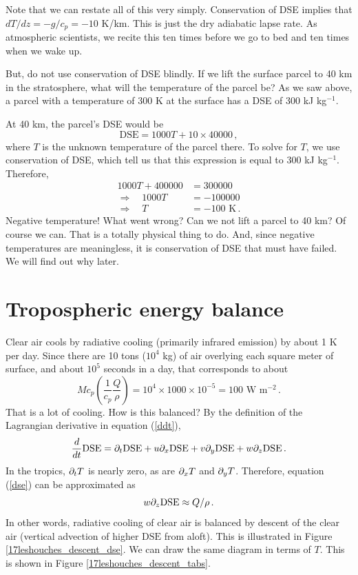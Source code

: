 \documentclass[12pt]{article}
\newcommand{\dse}{{\text{DSE}}}
\begin{document}
Note that we can restate all of this very simply.  Conservation of DSE implies that $dT/dz = -g/c_p = -10$ K/km.  This is just the dry adiabatic lapse rate.  As atmospheric scientists, we recite this ten times before we go to bed and ten times when we wake up.


But, do not use conservation of DSE blindly.  If we lift the surface parcel to 40 km in the stratosphere, what will the temperature of the parcel be?  As we saw above, a parcel with a temperature of 300 K at the surface has a DSE of 300 kJ kg$^{-1}$.  

At 40 km, the parcel's DSE would be
\[
\dse{} = 1000 T + 10 \times 40000 \, ,
\]
where $T$ is the unknown temperature of the parcel there.  To solve for $T$, we use conservation of DSE, which tell us that this expression is equal to 300 kJ kg$^{-1}$.  Therefore,
\begin{align}
1000 T + 400000 &= 300000 \\
\Rightarrow \quad 1000 T &= -100000 \\
\Rightarrow \quad T &= -100 \text{ K} \, .
\end{align}
Negative temperature!  What went wrong?  Can we not lift a parcel to 40 km?  Of course we can.  That is a totally physical thing to do.  And, since negative temperatures are meaningless, it is conservation of DSE that must have failed.  We will find out why later.


\section{Tropospheric energy balance}


Clear air cools by radiative cooling (primarily infrared emission) by about 1 K per day.  Since there are 10 tons ($10^4$ kg) of air overlying each square meter of surface, and about $10^5$ seconds in a day, that corresponds to about
\[
M c_p \left( \frac{1}{c_p} \frac{Q}{\rho} \right) = 10^4 \times 1000 \times 10^{-5} = 100 \text{ W m$^{-2}$} \, .
\]
That is a lot of cooling.  How is this balanced?  By the definition of the Lagrangian derivative in equation (\ref{ddt}),
\[
\ddt \dse = \ppt \dse + u \ppx \dse + v \ppy \dse + w \ppz \dse \, .
\]
In the tropics, $\partial_t T$ is nearly zero, as are $\partial_x T$ and $\partial_y T$.  Therefore, equation (\ref{dse}) can be approximated as
\[
w \ppz \dse \approx Q/\rho \, .
\]
In other words, radiative cooling of clear air is balanced by descent of the clear air (vertical advection of higher $\dse{}$ from aloft).  This is illustrated in Figure \ref{17leshouches_descent_dse}.  We can draw the same diagram in terms of $T$.  This is shown in Figure \ref{17leshouches_descent_tabs}.
\end{document}
